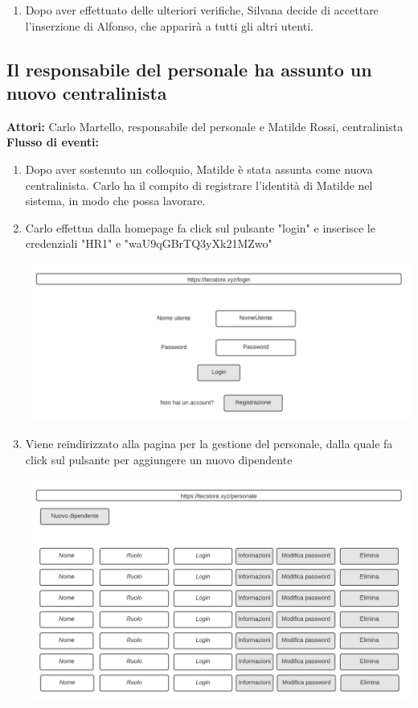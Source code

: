 \documentclass[12pt,a4paper]{article}
\begin{document}
\begin{enumerate}
\item Dopo aver effettuato delle ulteriori verifiche, Silvana decide di accettare l'inserzione di Alfonso, che apparirà a tutti gli altri utenti.
\end{enumerate}

\newpage

\subsection{Il responsabile del personale ha assunto un nuovo centralinista}
\textbf{Attori:} Carlo Martello, responsabile del personale e Matilde Rossi, centralinista \\

\noindent
\textbf{Flusso di eventi:}
\begin{enumerate}
\item Dopo aver sostenuto un colloquio, Matilde è stata assunta come nuova centralinista. Carlo ha il compito di registrare l'identità di Matilde nel sistema, in modo che possa lavorare.

\item Carlo effettua dalla homepage fa click sul pulsante "login" e inserisce le credenziali "HR1" e "waU9qGBrTQ3yXk21MZwo"

\includegraphics[width=\textwidth]{login}

\newpage
\item Viene reindirizzato alla pagina per la gestione del personale, dalla quale fa click sul pulsante per aggiungere un nuovo dipendente

\includegraphics[width=\textwidth]{personale}


\end{enumerate}
\end{document}
